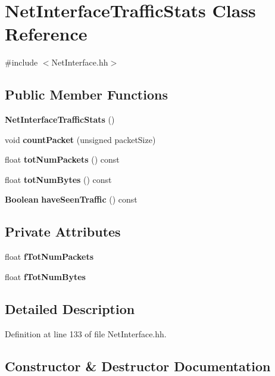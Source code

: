 \section{Net\+Interface\+Traffic\+Stats Class Reference}
\label{classNetInterfaceTrafficStats}


{\ttfamily \#include $<$Net\+Interface.\+hh$>$}

\subsection*{Public Member Functions}
\begin{DoxyCompactItemize}
\item 
{\bf Net\+Interface\+Traffic\+Stats} ()
\item 
void {\bf count\+Packet} (unsigned packet\+Size)
\item 
float {\bf tot\+Num\+Packets} () const 
\item 
float {\bf tot\+Num\+Bytes} () const 
\item 
{\bf Boolean} {\bf have\+Seen\+Traffic} () const 
\end{DoxyCompactItemize}
\subsection*{Private Attributes}
\begin{DoxyCompactItemize}
\item 
float {\bf f\+Tot\+Num\+Packets}
\item 
float {\bf f\+Tot\+Num\+Bytes}
\end{DoxyCompactItemize}


\subsection{Detailed Description}


Definition at line 133 of file Net\+Interface.\+hh.



\subsection{Constructor \& Destructor Documentation}
